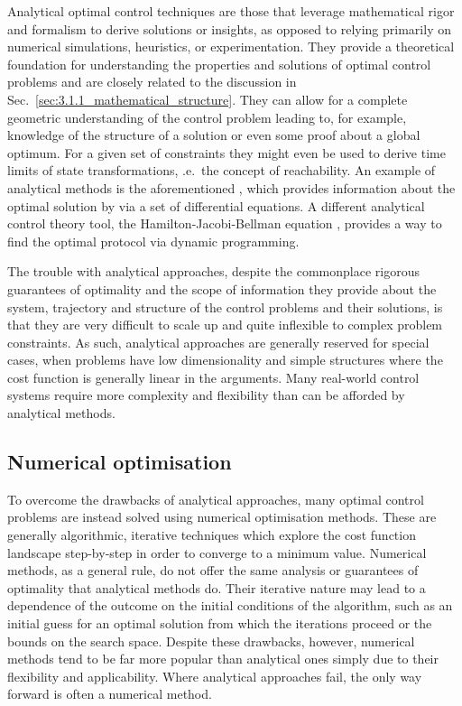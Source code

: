 Analytical optimal control techniques are those that leverage mathematical rigor and formalism to derive solutions or insights, as opposed to relying primarily on numerical simulations, heuristics, or experimentation. They provide a theoretical foundation for understanding the properties and solutions of optimal control problems and are closely related to the discussion in Sec.~\ref{sec:3.1.1_mathematical_structure}. They can allow for a complete geometric understanding of the control problem leading to, for example, knowledge of the structure of a solution or even some proof about a global optimum. For a given set of constraints they might even be used to derive time limits of state transformations, \@i.e.~the concept of reachability. An example of analytical methods is the aforementioned , which provides information about the optimal solution by via a set of differential equations. A different analytical control theory tool, the Hamilton-Jacobi-Bellman equation \cite{yong_dynamic_1999}, provides a way to find the optimal protocol via dynamic programming\cite{sniedovich_dynamic_2010}.

The trouble with analytical approaches, despite the commonplace rigorous guarantees of optimality and the scope of information they provide about the system, trajectory and structure of the control problems and their solutions, is that they are very difficult to scale up and quite inflexible to complex problem constraints. As such, analytical approaches are generally reserved for special cases, when problems have low dimensionality and simple structures where the cost function is generally linear in the arguments. Many real-world control systems require more complexity and flexibility than can be afforded by analytical methods.

\subsection{Numerical optimisation}\label{sec:3.1.3_numerical_optimisation}

To overcome the drawbacks of analytical approaches, many optimal control problems are instead solved using numerical optimisation methods. These are generally algorithmic, iterative  techniques which explore the cost function landscape step-by-step in order to converge to a minimum value. Numerical methods, as a general rule, do not offer the same analysis or guarantees of optimality that analytical methods do. Their iterative nature may lead to a dependence of the outcome on the initial conditions of the algorithm, such as an initial guess for an optimal solution from which the iterations proceed or the bounds on the search space. Despite these drawbacks, however, numerical methods tend to be far more popular than analytical ones simply due to their flexibility and applicability. Where analytical approaches fail, the only way forward is often a numerical method.

